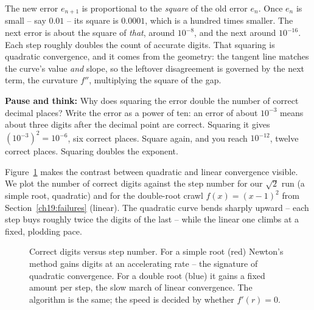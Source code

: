 \begin{focusbox}
The new error
$e_{n+1}$ is proportional to the \emph{square} of the old error $e_n$. Once $e_n$ is
small -- say $0.01$ -- its square is $0.0001$, which is a hundred times smaller. The
next error is about the square of \emph{that}, around $10^{-8}$, and the next around
$10^{-16}$. Each step roughly doubles the count of accurate digits. That squaring is
quadratic convergence, and it comes from the geometry: the tangent line matches the
curve's value \emph{and} slope, so the leftover disagreement is governed by the
next term, the curvature $f''$, multiplying the square of the gap.
\end{focusbox}

\textbf{Pause and think:} Why does squaring the error double the number of correct
decimal places? Write the error as a power of ten: an error of about $10^{-3}$
means about three digits after the decimal point are correct. Squaring it gives
$(10^{-3})^2 = 10^{-6}$, six correct places. Square again, and you reach
$10^{-12}$, twelve correct places. Squaring doubles the exponent.

Figure~\ref{ch19:fig-convergence} makes the contrast between quadratic and linear
convergence visible. We plot the number of correct digits against the step number
for our $\sqrt2$ run (a simple root, quadratic) and for the double-root crawl
$f(x)=(x-1)^2$ from Section~\ref{ch19:failures} (linear). The quadratic curve
bends sharply upward -- each step buys roughly twice the digits of the last -- while
the linear one climbs at a fixed, plodding pace.

\begin{figure}[H]
\centering
{}
\caption{Correct digits versus step number. For a simple root (red) Newton's method
gains digits at an accelerating rate -- the signature of quadratic convergence. For a
double root (blue) it gains a fixed amount per step, the slow march of linear
convergence. The algorithm is the same; the speed is decided by
whether $f'(r)=0$.}
\label{ch19:fig-convergence}
\end{figure}

